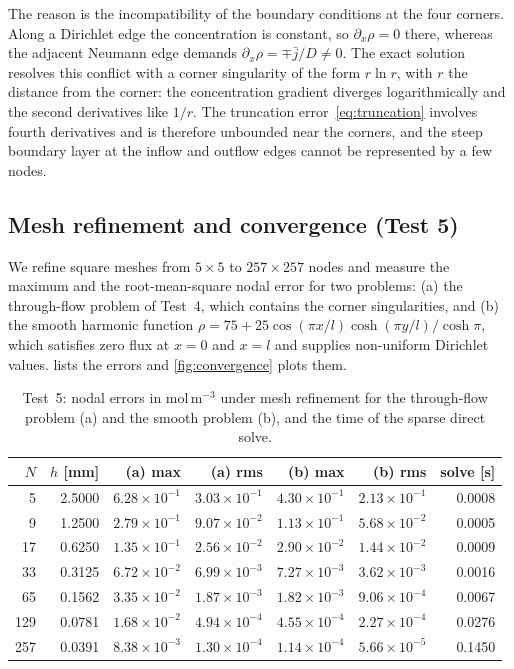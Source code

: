 \documentclass[11pt,a4paper]{article}
\numberwithin{equation}{section}
\theoremstyle{definition}
\theoremstyle{remark}
\begin{document}
The reason is the incompatibility of the boundary conditions at the four corners. Along a Dirichlet
edge the concentration is constant, so $\partial_x\rho = 0$ there, whereas the adjacent Neumann edge
demands $\partial_x\rho = \mp\bar j/D \ne 0$. The exact solution resolves this conflict with a corner
singularity of the form $r\ln r$, with $r$ the distance from the corner: the concentration gradient
diverges logarithmically and the second derivatives like $1/r$. The truncation
error~\eqref{eq:truncation} involves fourth derivatives and is therefore unbounded near the corners,
and the steep boundary layer at the inflow and outflow edges cannot be represented by a few nodes.

\subsection{Mesh refinement and convergence (Test 5)}\label{sec:test5}

We refine square meshes from $5\times5$ to $257\times257$ nodes and measure the maximum and the
root-mean-square nodal error for two problems: (a) the through-flow problem of Test~4, which contains
the corner singularities, and (b) the smooth harmonic function
$\rho = 75 + 25\cos(\pi x/l)\cosh(\pi y/l)/\cosh\pi$, which satisfies zero flux at $x = 0$ and
$x = l$ and supplies non-uniform Dirichlet values.  lists the errors and
\cref{fig:convergence} plots them.

\begin{table}[ht]
  \centering
  \caption{Test~5: nodal errors in $\mathrm{mol\,m^{-3}}$ under mesh refinement for the through-flow
    problem (a) and the smooth problem (b), and the time of the sparse direct solve.}
  \label{tab:convergence}
  \begin{tabular}{rrrrrrr}
    \toprule
    $N$ & $h$ [mm] & (a) max & (a) rms & (b) max & (b) rms & solve [s] \\
    \midrule
      5 & 2.5000 & $6.28\times10^{-1}$ & $3.03\times10^{-1}$ & $4.30\times10^{-1}$ & $2.13\times10^{-1}$ & 0.0008 \\
      9 & 1.2500 & $2.79\times10^{-1}$ & $9.07\times10^{-2}$ & $1.13\times10^{-1}$ & $5.68\times10^{-2}$ & 0.0005 \\
     17 & 0.6250 & $1.35\times10^{-1}$ & $2.56\times10^{-2}$ & $2.90\times10^{-2}$ & $1.44\times10^{-2}$ & 0.0009 \\
     33 & 0.3125 & $6.72\times10^{-2}$ & $6.99\times10^{-3}$ & $7.27\times10^{-3}$ & $3.62\times10^{-3}$ & 0.0016 \\
     65 & 0.1562 & $3.35\times10^{-2}$ & $1.87\times10^{-3}$ & $1.82\times10^{-3}$ & $9.06\times10^{-4}$ & 0.0067 \\
    129 & 0.0781 & $1.68\times10^{-2}$ & $4.94\times10^{-4}$ & $4.55\times10^{-4}$ & $2.27\times10^{-4}$ & 0.0276 \\
    257 & 0.0391 & $8.38\times10^{-3}$ & $1.30\times10^{-4}$ & $1.14\times10^{-4}$ & $5.66\times10^{-5}$ & 0.1450 \\
    \bottomrule
  \end{tabular}
\end{table}
\end{document}
